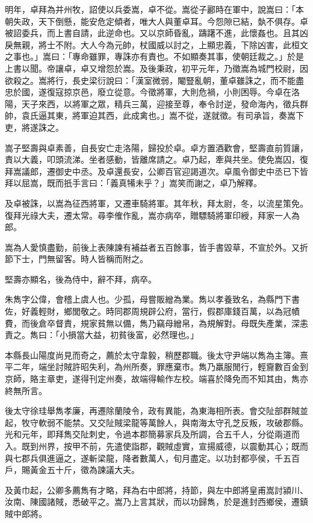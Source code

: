 \begin{pinyinscope}
明年，卓拜為并州牧，詔使以兵委嵩，卓不從。嵩從子酈時在軍中，說嵩曰：「本朝失政，天下倒懸，能安危定傾者，唯大人與董卓耳。今怨隙已結，埶不俱存。卓被詔委兵，而上書自請，此逆命也。又以京師昏亂，躊躇不進，此懷姦也。且其凶戾無親，將士不附。大人今為元帥，杖國威以討之，上顯忠義，下除凶害，此桓文之事也。」嵩曰：「專命雖罪，專誅亦有責也。不如顯奏其事，使朝廷裁之。」於是上書以聞。帝讓卓，卓又增怨於嵩。及後秉政，初平元年，乃徵嵩為城門校尉，因欲殺之。嵩將行，長史梁衍說曰：「漢室微弱，閹豎亂朝，董卓雖誅之，而不能盡忠於國，遂復寇掠京邑，廢立從意。今徵將軍，大則危禍，小則困辱。今卓在洛陽，天子來西，以將軍之眾，精兵三萬，迎接至尊，奉令討逆，發命海內，徵兵群帥，袁氏逼其東，將軍迫其西，此成禽也。」嵩不從，遂就徵。有司承旨，奏嵩下吏，將遂誅之。

嵩子堅壽與卓素善，自長安亡走洛陽，歸投於卓。卓方置酒歡會，堅壽直前質讓，責以大義，叩頭流涕。坐者感動，皆離席請之。卓乃起，牽與共坐。使免嵩囚，復拜嵩議郎，遷御史中丞。及卓還長安，公卿百官迎謁道次。卓風令御史中丞已下皆拜以屈嵩，既而扺手言曰：「義真犕未乎？」嵩笑而謝之，卓乃解釋。

及卓被誅，以嵩為征西將軍，又遷車騎將軍。其年秋，拜太尉，冬，以流星策免。復拜光祿大夫，遷太常。尋李傕作亂，嵩亦病卒，贈驃騎將軍印綬，拜家一人為郎。

嵩為人愛慎盡勤，前後上表陳諫有補益者五百餘事，皆手書毀草，不宣於外。又折節下士，門無留客。時人皆稱而附之。

堅壽亦顯名，後為侍中，辭不拜，病卒。

朱雋字公偉，會稽上虞人也。少孤，母嘗販繒為業。雋以孝養致名，為縣門下書佐，好義輕財，鄉閭敬之。時同郡周規辟公府，當行，假郡庫錢百萬，以為冠幘費，而後倉卒督責，規家貧無以備，雋乃竊母繒帛，為規解對。母既失產業，深恚責之。雋曰：「小損當大益，初貧後富，必然理也。」

本縣長山陽度尚見而奇之，薦於太守韋毅，稍歷郡職。後太守尹端以雋為主簿。熹平二年，端坐討賊許昭失利，為州所奏，罪應棄市。雋乃羸服閒行，輕齎數百金到京師，賂主章吏，遂得刊定州奏，故端得輸作左校。端喜於降免而不知其由，雋亦終無所言。

後太守徐珪舉雋孝廉，再遷除蘭陵令，政有異能，為東海相所表。會交阯部群賊並起，牧守軟弱不能禁。又交阯賊梁龍等萬餘人，與南海太守孔芝反叛，攻破郡縣。光和元年，即拜雋交阯刺史，令過本郡簡募家兵及所調，合五千人，分從兩道而入。既到州界，按甲不前，先遣使詣郡，觀賊虛實，宣揚威德，以震動其心；既而與七郡兵俱進逼之，遂斬梁龍，降者數萬人，旬月盡定。以功封都亭侯，千五百戶，賜黃金五十斤，徵為諫議大夫。

及黃巾起，公卿多薦雋有才略，拜為右中郎將，持節，與左中郎將皇甫嵩討潁川、汝南、陳國諸賊，悉破平之。嵩乃上言其狀，而以功歸雋，於是進封西鄉侯，遷鎮賊中郎將。


\end{pinyinscope}

